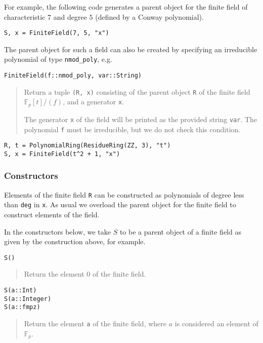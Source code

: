 \documentclass[a4paper,10pt]{article}
\newcommand{\F}{\mathbb{F}}
\newcommand{\code}{\lstinline}
\newcommand{\desc}[1]{\vspace{-3mm}\begin{quote}#1\end{quote}}
\begin{document}
{{For example, the following code generates a parent object for the finite field
of characteristic $7$ and degree $5$ (defined by a Conway polynomial).

\begin{lstlisting}
S, x = FiniteField(7, 5, "x")
\end{lstlisting}

The parent object for such a field can also be created by specifying
an irreducible polynomial of type \code{nmod_poly}, e.g.

\begin{lstlisting}
FiniteField(f::nmod_poly, var::String)
\end{lstlisting}

\desc{Return a tuple \code{(R, x)} consisting of the parent object \code{R} of
the finite field $\F_p[t]/(f)$, and a generator \code{x}.

The generator \code{x} of the field will be printed as the provided string
\code{var}. The polynomial \code{f} must be irreducible, but we do not check this
condition.}

\begin{lstlisting}
R, t = PolynomialRing(ResidueRing(ZZ, 3), "t")
S, x = FiniteField(t^2 + 1, "x")
\end{lstlisting}

\subsubsection{Constructors}

Elements of the finite field \code{R} can be constructed as polynomials of
degree less than \code{deg} in \code{x}. As usual we overload the parent object
for the finite field to construct elements of the field.

In the constructors below, we take $S$ to be a parent object of a finite field
as given by the construction above, for example.

\begin{lstlisting}
S()
\end{lstlisting}

\desc{Return the element $0$ of the finite field.}

\begin{lstlisting}
S(a::Int)
S(a::Integer)
S(a::fmpz)
\end{lstlisting}

\desc{Return the element \code{a} of the finite field, where $a$ is considered 
an element of $\F_p$.}

}}
\end{document}
